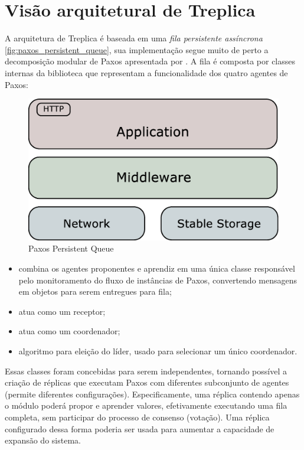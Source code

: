 \section{Visão arquitetural de Treplica}\label{sec:visao_arquitetural}

A arquitetura de Treplica é baseada em uma \emph{fila persistente assíncrona}
\autoref{fig:paxos_persistent_queue}, sua implementação segue muito de perto a
decomposição modular de Paxos apresentada por . A fila é composta
por classes internas da biblioteca que representam a funcionalidade dos quatro agentes
de Paxos:

\begin{figure}[ht]
  \centering
  \includegraphics[width=12cm]{conteudo/capitulos/figuras/block-simple.eps}
  \caption{Paxos Persistent Queue}
  \label{fig:paxos_persistent_queue}
\end{figure}

\begin{itemize}
  \item {} combina os agentes proponentes e aprendiz em uma única classe
    responsável pelo monitoramento do fluxo de instâncias de Paxos, convertendo
    mensagens em objetos para serem entregues para fila;
  \item {} atua como um receptor;
  \item {} atua como um coordenador;
  \item {} algoritmo para eleição do líder, usado para selecionar um
    único coordenador.
\end{itemize}

Essas classes foram concebidas para serem independentes, tornando possível a criação de
réplicas que executam Paxos com diferentes subconjunto de agentes (permite diferentes
configurações). Especificamente, uma réplica contendo apenas o módulo 
poderá propor e aprender valores, efetivamente executando uma fila completa, sem
participar do processo de consenso (votação). Uma réplica configurado dessa forma poderia
ser usada para aumentar a capacidade de expansão do sistema.

